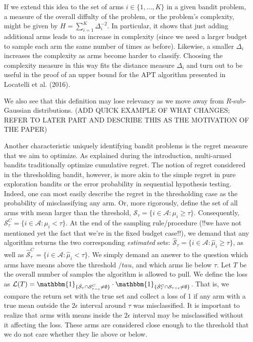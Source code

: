 \documentclass[12pt,]{article}
\begin{document}
If we extend this idea to the set of arms \(i \in \{1,...,K\}\) in a
given bandit problem, a measure of the overall diffulty of the problem,
or the problem's complexity, might be given by
\(H = \sum_{i=1}^{K} \Delta_i^{-2}\). In particular, it shows that just
adding additional arms leads to an increase in complexity (since we need
a larger budget to sample each arm the same number of times as before).
Likewise, a smaller \(\Delta_i\) increases the complexity as arms become
harder to classify. Choosing the complexity measure in this way fits the
distance measure \(\Delta_i\) and turn out to be useful in the proof of
an upper bound for the APT algorithm presented in Locatelli et al.
(2016).

We also see that this definition may lose relevancy as we move away from
\(R\)-sub-Gaussian distributions. (ADD QUICK EXAMPLE OF WHAT CHANGES;
REFER TO LATER PART AND DESCRIBE THIS AS THE MOTIVATION OF THE PAPER)

Another characteristic uniquely identifying bandit problems is the
regret measure that we aim to optimize. As explained during the
introduction, multi-armed bandits traditionally optimize cumulative
regret. The notion of regret considered in the thresholding bandit,
however, is more akin to the simple regret in pure exploration bandits
or the error probability in sequential hypothesis testing. Indeed, one
can most easily describe the regret in the thresholding case as the
probability of misclassifying any arm. Or, more rigorously, define the
set of all arms with mean larger than the threshold,
\(\mathcal{S}_\tau = \{i \in \mathcal{A}: \mu_i \geq \tau\}\).
Consequently,
\(\mathcal{S}_\tau^C = \{i \in \mathcal{A}: \mu_i < \tau\}\). At the end
of the sampling rule/procedure (!!we have not mentioned yet the fact
that we're in the fixed budget case!!), we demand that any algorithm
returns the two corresponding \emph{estimated} sets:
\(\hat{\mathcal{S}}_{\tau} = \{i \in \mathcal{A}: \hat{\mu}_i \geq \tau\}\),
as well as
\(\hat{\mathcal{S}}_{\tau}^C = \{i \in \mathcal{A}: \hat{\mu}_i < \tau\}\).
We simply demand an answer to the question which arms have means above
the threshold \(/tau\), and which arms lie below \(\tau\). Let \(T\) be
the overall number of samples the algorithm is allowed to pull. We
define the loss as
\(\mathcal{L}(T) = \mathbbm{1}_{\{\hat{\mathcal{S}}_{\tau} \cap \mathcal{S}_{\tau-\epsilon}^C \neq \emptyset\}} \cdot \mathbbm{1}_{\{\hat{\mathcal{S}}_{\tau}^C \cap \mathcal{S}_{\tau+\epsilon} \neq \emptyset\}}\).
That is, we compare the return set with the true set and collect a loss
of 1 if any arm with a true mean outside the \(2\epsilon\) interval
around \(\tau\) was misclassified. It is important to realize that arms
with means inside the \(2 \epsilon\) interval may be misclassified
without it affecting the loss. These arms are considered close enough to
the threshold that we do not care whether they lie above or below.
\end{document}

